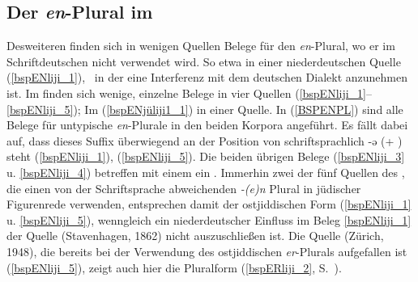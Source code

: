 \subsection{Der \textit{en}-Plural im \hai{{\LiJi}}}\label{enPLURAL}
Desweiteren finden sich in wenigen Quellen Belege für den \textit{en}-Plural, wo er im Schriftdeutschen nicht verwendet wird. So etwa in einer niederdeutschen Quelle (\ref{bspENliji_1}), \,%
 in der eine Interferenz mit dem deutschen Dialekt anzunehmen ist. Im  finden sich wenige, einzelne Belege in vier Quellen (\ref{bspENliji_1}–\ref{bspENliji_5}); Im  (\ref{bspENjüliji1_1}) in einer Quelle. In (\ref{BSPENPL}) sind alle Belege für untypische \textit{en}-Plurale in den beiden Korpora angeführt. Es fällt dabei auf, dass dieses Suffix überwiegend an der Position von schriftsprachlich -ə (+ ) steht (\ref{bspENliji_1}), (\ref{bspENliji_5}). Die beiden übrigen Belege (\ref{bspENliji_3} u. \ref{bspENliji_4}) betreffen mit einem  ein . Immerhin zwei der fünf Quellen des , die einen von der Schriftsprache abweichenden \textit{-(e)n} Plural in jüdischer Figurenrede verwenden, entsprechen damit der ostjiddischen Form (\ref{bspENliji_1} u. \ref{bspENliji_5}), wenngleich ein niederdeutscher Einfluss im Beleg \ref{bspENliji_1} der Quelle  (Stavenhagen, 1862) nicht auszuschließen ist. Die Quelle  (Zürich, 1948), die bereits bei der Verwendung des ostjiddischen \textit{er}-Plurals aufgefallen ist (\ref{bspENliji_5}), zeigt auch hier die  {\oj} Pluralform (\ref{bspERliji_2}, S.\, \pageref{bspERliji_2}). 



